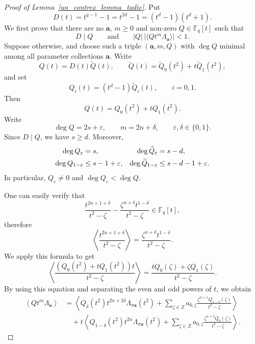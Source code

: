 \documentclass[11pt]{article}
\theoremstyle{remark}
\begin{document}
\begin{proof}[Proof of Lemma~\ref{un_contrex_lemma_tadic}]
Put
\begin{equation} \label{eq:D-polynomial}
 D(t)=t^{q-1}-1=t^{2d}-1=(t^d-1)(t^d+1).
\end{equation}
We first prove that there are no $\mathbf a$, $m\geq0$ and non-zero
$Q\in\mathbb F_q[t]$ such that
\begin{equation} \label{eq:key-violation}
 D\mid Q
 \qquad\text{and}\qquad
 |Q|\,|\langle Qt^m\Lambda_{\mathbf a}\rangle|<1.
\end{equation}
Suppose otherwise, and choose such a triple $(\mathbf a, m, Q)$ with
$\deg Q$ minimal among all parameter collections $\mathbf a$. Write
\begin{equation} \label{eq:Q-parity-decomposition}
 Q(t)=D(t)\widetilde Q(t),
 \qquad
 \widetilde Q(t)=\widetilde Q_0(t^2)+t\widetilde Q_1(t^2),
\end{equation}
and set
\begin{equation} \label{eq:Qi-definition}
 Q_i(t)=(t^d-1)\widetilde Q_i(t),\qquad i=0,1.
\end{equation}
Then
\begin{equation} \label{eq:Q-even-odd}
 Q(t)=Q_0(t^2)+tQ_1(t^2).
\end{equation}
Write
\begin{equation} \label{eq:degree-parities}
 \deg Q=2s+\varepsilon,
 \qquad
 m=2n+\delta,
 \qquad \varepsilon,\delta\in\{0,1\}.
\end{equation}
Since $D\mid Q$, we have $s\geq d$.  Moreover,
\begin{align} \label{eq:parity-degrees}
 \deg Q_\varepsilon&=s,
 &\deg\widetilde Q_\varepsilon&=s-d,\notag\\
 \deg Q_{1-\varepsilon}&\leq s-1+\varepsilon,
 &\deg\widetilde Q_{1-\varepsilon}&\leq s-d-1+\varepsilon.
\end{align}
In particular, $Q_\varepsilon\ne0$ and $\deg Q_\varepsilon<\deg Q$.

One can easily verify that
$$
 \frac{t^{2n+1+\delta}}{t^2-\zeta} -
 \frac{\zeta^{n+\delta}t^{1-\delta}}{t^2-\zeta} \in \mathbb F_q[t],
$$
therefore
\[
 \left\langle
 \frac{t^{2n+1+\delta}}{t^2-\zeta}
 \right\rangle
 =
 \frac{\zeta^{n+\delta}t^{1-\delta}}{t^2-\zeta}.
\]
We apply this formula to get
$$
\left\langle \frac{(Q_0(t^2) + tQ_1(t^2))t}{t^2-\zeta}\right\rangle
= \frac{tQ_0(\zeta) + \zeta Q_1(\zeta)}{t^2-\zeta}.
$$
By using this equation and separating the even and odd powers of
$t$, we obtain
\begin{align*}
 \left\langle Qt^m\Lambda_{\mathbf a}\right\rangle
 &=
 \left\langle
 Q_\delta(t^2)t^{2n+2\delta}
 \Lambda_{\sigma\mathbf a}(t^2)
 +
 \sum_{\zeta\in Z}
 a_{0,\zeta}
 \frac{\zeta^{n+1}Q_{1-\delta}(\zeta)}
      {t^2-\zeta}
 \right\rangle
 \\
 &\quad
 +t\left\langle
 Q_{1-\delta}(t^2)t^{2n}
 \Lambda_{\sigma\mathbf a}(t^2)
 +
 \sum_{\zeta\in Z}
 a_{0,\zeta}
 \frac{\zeta^{n+\delta}Q_\delta(\zeta)}
      {t^2-\zeta}
 \right\rangle .
\end{align*}




\end{proof}
\end{document}
